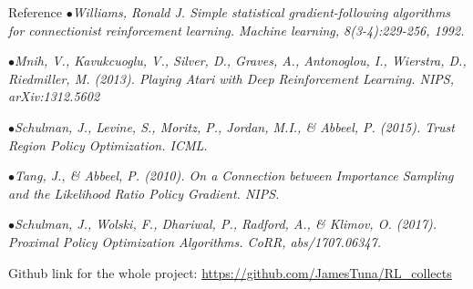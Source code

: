 \begin{frame}{Reference}
    $\bullet$\hspace{0.2cm}\textit{Williams, Ronald J. Simple statistical gradient-following algorithms for connectionist reinforcement learning. Machine learning, 8(3-4):229-256, 1992.}\\\vspace{0.2cm}

    $\bullet$\hspace{0.2cm}\textit{Mnih, V., Kavukcuoglu, V., Silver, D., Graves, A., Antonoglou, I., Wierstra, D., Riedmiller, M. (2013). Playing Atari with Deep Reinforcement Learning. NIPS, arXiv:1312.5602 }\\\vspace{0.2cm} 

    $\bullet$\hspace{0.2cm}\textit{Schulman, J., Levine, S., Moritz, P., Jordan, M.I., \& Abbeel, P. (2015). Trust Region Policy Optimization. ICML.}\\\vspace{0.2cm}

    $\bullet$\hspace{0.2cm}\textit{Tang, J., \& Abbeel, P. (2010). On a Connection between Importance Sampling and the Likelihood Ratio Policy Gradient. NIPS.}\\\vspace{0.2cm}
    
    $\bullet$\hspace{0.2cm}\textit{Schulman, J., Wolski, F., Dhariwal, P., Radford, A., \& Klimov, O. (2017). Proximal Policy Optimization Algorithms. CoRR, abs/1707.06347.}\\\vspace{0.2cm}
    
    \begin{center}Github link for the whole project: \href{https://github.com/JamesTuna/RL_collects}{https://github.com/JamesTuna/RL\_collects}\end{center}

\end{frame}

